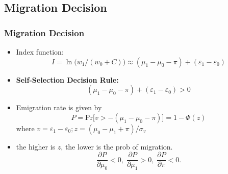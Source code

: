 \documentclass[10pt]{beamer}
\begin{document}
\subsection{Migration Decision}
\begin{frame}[c]\frametitle{Migration Decision}

\begin{itemize}
    \item Index function:
    \begin{equation}
        I = \ln\big(w_{1}/(w_{0}+C)\big)\approx (\mu_{1}-\mu_{0} - \pi) + (\varepsilon_{1} - \varepsilon_{0})
    \end{equation}
    \item \alert{\textbf {Self-Selection Decision Rule:}}
    \begin{equation*}
        (\mu_{1} - \mu_{0} -\pi) + (\varepsilon_{1} - \varepsilon_{0}) > 0
    \end{equation*}
    \item Emigration rate is given by
    \begin{equation}
        P = \mathrm{Pr}\big[v > -(\mu_{1} - \mu_{0} - \pi)\big] = 1- \Phi(z)
    \end{equation}
    where $v=\varepsilon_{1}-\varepsilon_{0}; z=(\mu_{0}-\mu_{1}+\pi)/\sigma_{v}$
    \item the higher is $z$, the lower is the prob of migration.
    \begin{equation*}
        \frac{\partial P}{\partial \mu_{0}} < 0, \; \frac{\partial P}{\partial \mu_{1}} > 0, \; \frac{\partial P}{\partial \pi} <0.
    \end{equation*}

\end{itemize}

\end{frame}
\end{document}

